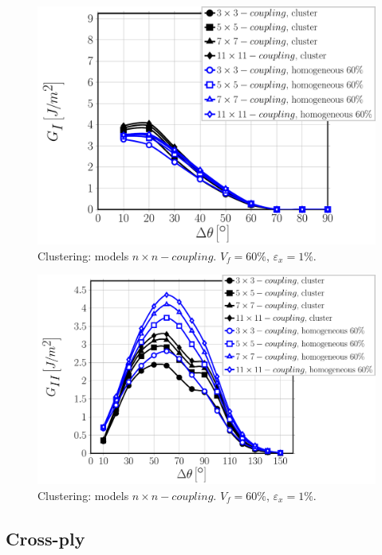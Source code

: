 \documentclass[review]{elsarticle}
\begin{document}
\begin{figure}[!h]
\centering
\includegraphics[width=\textwidth]{nxn-coupling-vf60-GI.pdf}
\caption{Clustering: models $n\times n-coupling$. $V_{f}=60\%$, $\varepsilon_{x}=1\%$.}\label{fig:debonddebondGI}
\end{figure}

\begin{figure}[!h]
\centering
\includegraphics[width=\textwidth]{nxn-coupling-vf60-GII.pdf}
\caption{Clustering: models $n\times n-coupling$. $V_{f}=60\%$, $\varepsilon_{x}=1\%$.}\label{fig:debonddebondGI}
\end{figure}

\subsection{Cross-ply}\label{subsec:crossply}
\end{document}

